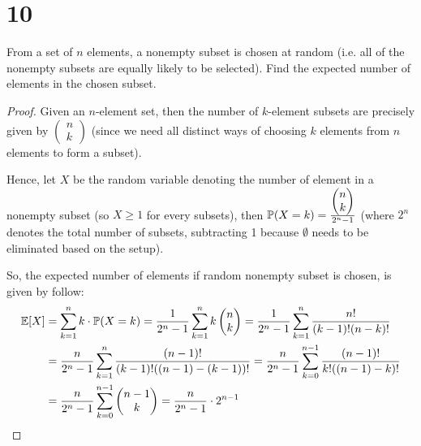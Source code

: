 \documentclass{article}
\begin{document}
\section*{10}
\begin{ques}\label{q10}
    From a set of $n$ elements, a nonempty subset is chosen at random (i.e. all of the nonempty subsets are equally likely to be selected). Find the expected number of elements in the chosen subset.
\end{ques}
\begin{proof}
    Given an $n$-element set, then the number of $k$-element subsets are precisely given by $\begin{pmatrix}n\\k\end{pmatrix}$ (since we need all distinct ways of choosing $k$ elements from $n$ elements to form a subset).

    Hence, let $X$ be the random variable denoting the number of element in a nonempty subset (so $X\geq 1$ for every subsets), then $\mathbb{P}(X=k)=\frac{\begin{pmatrix}n\\k\end{pmatrix}}{2^n-1}$ (where $2^n$ denotes the total number of subsets, subtracting 1 because $\emptyset$ needs to be eliminated based on the setup). 

    So, the expected number of elements if random nonempty subset is chosen, is given by follow:
    \begin{align}
        \mathbb{E}[X]&=\sum_{k=1}^{n} k\cdot \mathbb{P}(X=k) = \frac{1}{2^n-1}\sum_{k=1}^{n}k\begin{pmatrix}n\\k\end{pmatrix} = \frac{1}{2^n-1}\sum_{k=1}^{n}\frac{n!}{(k-1)!(n-k)!}\\ 
        &= \frac{n}{2^n-1}\sum_{k=1}^{n}\frac{(n-1)!}{(k-1)!((n-1)-(k-1))!} = \frac{n}{2^n-1}\sum_{k=0}^{n-1}\frac{(n-1)!}{k!((n-1)-k)!}\\
        &= \frac{n}{2^n-1}\sum_{k=0}^{n-1}\begin{pmatrix}n-1\\k\end{pmatrix} = \frac{n}{2^n-1}\cdot 2^{n-1}
    \end{align}
\end{proof}
\end{document}
